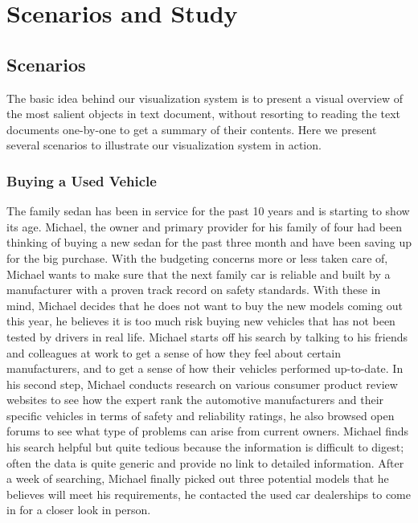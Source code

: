 \chapter{Scenarios and Study}

\section{Scenarios}
The basic idea behind our visualization system is to present a visual overview
of the most salient objects in text document, without resorting to reading the
text documents one-by-one to get a summary of their contents. Here we present
several scenarios to illustrate our visualization system in action.

\subsection{Buying a Used Vehicle}
The family sedan has been in service for the past 10 years and is starting to
show its age. Michael, the owner and primary provider for his family of four had 
been thinking of buying a new sedan for the past three month and have been saving 
up for the big purchase. With the budgeting concerns more or less taken care of, 
Michael wants to make sure that the next family car is reliable and built by a 
manufacturer with a proven track record on safety standards. With these in mind, 
Michael decides that he does not want to buy the new models coming out this year, 
he believes it is too much risk buying new vehicles that has not been tested by 
drivers in real life. Michael starts off his search by talking to his friends and 
colleagues at work to get a sense of how they feel about certain manufacturers, 
and to get a sense of how their vehicles performed up-to-date. In his second step, 
Michael conducts research on various consumer product review websites to see how 
the expert rank the automotive manufacturers and their specific vehicles in terms 
of safety and reliability ratings, he also browsed open forums to see what type of 
problems can arise from current owners. Michael finds his search helpful but quite 
tedious because the information is difficult to digest; often the data is quite 
generic and provide no link to detailed information. After a week of searching, 
Michael finally picked out three potential models that he believes will meet 
his requirements, he contacted the used car dealerships to come in for a closer 
look in person.

